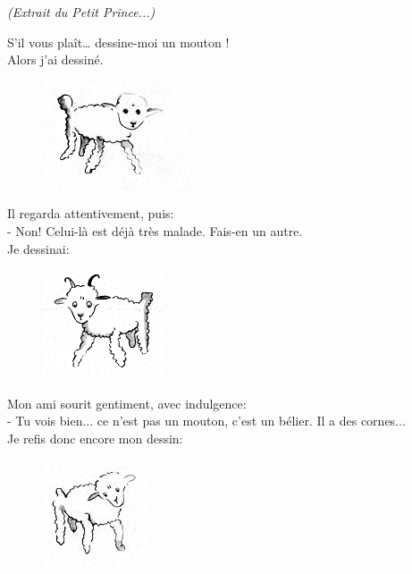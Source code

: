 \textit{(Extrait du Petit Prince...)}

\begin{multicols}{2}
  \og S'il vous plaît… dessine-moi un mouton ! \fg\\
  Alors j'ai dessiné.
  
  \begin{figure}[H]
    \centering
    \includegraphics[width=0.3\linewidth]{4x5-calcul-litteral/mouton2.png}
  \end{figure}

  Il regarda attentivement, puis: \\
  - Non! Celui-là est déjà très malade. Fais-en un autre. \\
  Je dessinai:

  \begin{figure}[H]
    \centering
    \includegraphics[width=0.3\linewidth]{4x5-calcul-litteral/mouton1.png}
  \end{figure}

  Mon ami sourit gentiment, avec indulgence: \\
  - Tu vois bien... ce n'est pas un mouton, c'est un bélier. Il a des cornes... \\
  Je refis donc encore mon dessin:

  \begin{figure}[H]
    \centering
    \includegraphics[width=0.3\linewidth]{4x5-calcul-litteral/mouton3.png}
  \end{figure}
  

\end{multicols}
